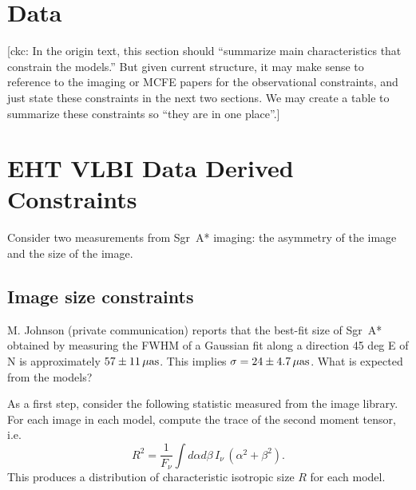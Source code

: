 \documentclass[twocolumn,tighten,dvipsnames]{aastex63}
\newcommand\sgra{Sgr~A*\xspace}
\newcommand\uas{{\rm \, \mu as}}
\newcommand\<{{\langle}}
\renewcommand\>{{\rangle}} %
\newcommand\ckc[1]{{\color{MidnightBlue}[ckc: #1]}}
\begin{document}
\section{Data}


\ckc{In the origin text, this section should ``summarize main
  characteristics that constrain the models.''
  But given current structure, it may make sense to reference to the
  imaging or MCFE papers for the observational constraints, and just
  state these constraints in the next two sections.
  We may create a table to summarize these constraints so ``they are
  in one place''.}

\section{EHT VLBI Data Derived Constraints}
\label{sec:EHT_VLBI}

Consider two measurements from \sgra imaging: the asymmetry of the
image and the size of the image.

\subsection{Image size constraints}
\label{sec:sizeconst}

M. Johnson (private communication) reports that the best-fit size of \sgra obtained by measuring the FWHM of a Gaussian fit along a direction 45 deg E of N is approximately $57 \pm 11 \uas$.  This implies $\sigma = 24 \pm 4.7 \uas$.  What is expected from the models?

As a first step, consider the following statistic measured from the image library.  For each image in each model, compute the trace of the second moment tensor, i.e.
\begin{equation}
  R^2 = \frac{1}{F_\nu} \int d\alpha d\beta \, I_\nu \, (\alpha^2 + \beta^2).
\end{equation}
This produces a distribution of characteristic isotropic size $R$ for each model.
\end{document}
